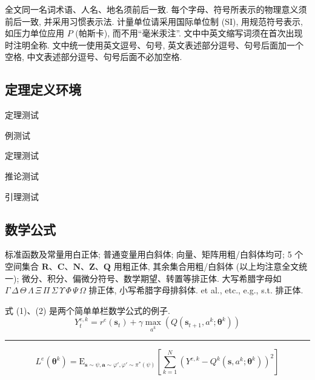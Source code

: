 \documentclass{aas}
\begin{document}
全文同一名词术语、人名、地名须前后一致. 每个字母、符号所表示的物理意义须前后一致, 并采用习惯表示法. 计量单位请采用国际单位制 (SI), 用规范符号表示, 如压力单位应用 $P$ (帕斯卡), 而不用``毫米汞注''. 文中中英文缩写词须在首次出现时注明全称. 文中统一使用英文逗号、句号, 英文表述部分逗号、句号后面加一个空格, 中文表述部分逗号、句号后面不必加空格.

\subsection{定理定义环境}

\begin{theorem}
定理测试
\end{theorem}

\begin{example}
例测试
\end{example}

\begin{definition}
定理测试
\end{definition}

\begin{corollary}
推论测试
\end{corollary}

\begin{lemma}
引理测试
\end{lemma}

\subsection{数学公式}


标准函数及常量用白正体;
普通变量用白斜体; 向量、矩阵用粗/白斜体均可;
5 个空间集合 $\mathbf{R}$、$\mathbf{C}$、$\mathbf{N}$、$\mathbf{Z}$、$\mathbf{Q}$
用粗正体,
其余集合用粗/白斜体 (以上均注意全文统一);
微分、积分、偏微分符号、数学期望、转置等排正体.
大写希腊字母如 $\Gamma\,\Delta\,\Theta\,\Lambda\,\Xi\,\Pi\,\Sigma\,
\Upsilon\,\Phi\,\Psi\,\Omega$ 排正体, 小写希腊字母排斜体. et al.,
etc., e.g., s.t. 排正体.

式 (1)、(2) 是两个简单单栏数学公式的例子.
\begin{equation}
Y_t^{e,k} = r^e\left( {{{\boldsymbol s}_t}} \right) + \gamma \max_{a^k} \left( {Q\left( {{{\boldsymbol s}_{t + 1}},{a^k};{{\boldsymbol \theta} ^k}} \right)} \right)
\end{equation}
\addtocounter{equation}{1}
\noindent
\parbox{\textwidth}{%
\medskip
\hrule
\medskip
\begin{equation}
  L^e\left( {{{\boldsymbol \theta} ^k}} \right)
= \mathrm{E}_{{\boldsymbol s}\sim\psi ,{\boldsymbol a}\sim\varphi ',\varphi '\sim{\pi ^*}\left( \psi  \right)}
  \left[ {\sum\limits_{k = 1}^N {{{\left( {Y_{}^{e,k} - {Q^k}\left( {{\boldsymbol s},a_{}^k;{{\boldsymbol \theta} ^k}} \right)} \right)}^2}} } \right]
\end{equation}
}
\end{document}
